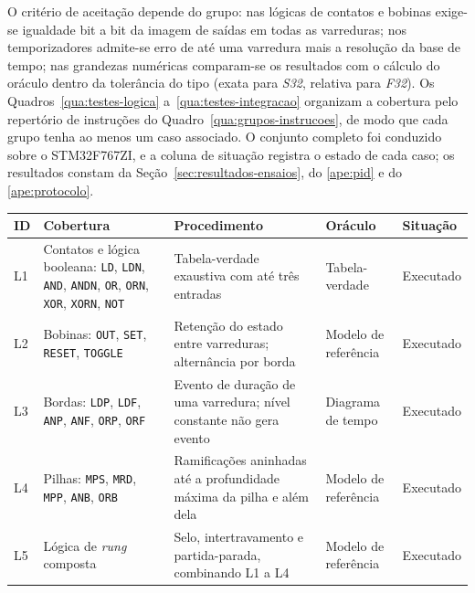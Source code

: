 O critério de aceitação depende do grupo: nas lógicas de contatos e bobinas exige-se igualdade bit a bit da imagem de saídas em todas as varreduras; nos temporizadores admite-se erro de até uma varredura mais a resolução da base de tempo; nas grandezas numéricas comparam-se os resultados com o cálculo do oráculo dentro da tolerância do tipo (exata para \textit{S32}, relativa para \textit{F32}).
Os Quadros~\ref{qua:testes-logica} a~\ref{qua:testes-integracao} organizam a cobertura pelo repertório de instruções do Quadro~\ref{qua:grupos-instrucoes}, de modo que cada grupo tenha ao menos um caso associado.
O conjunto completo foi conduzido sobre o STM32F767ZI, e a coluna de situação registra o estado de cada caso; os resultados constam da Seção~\ref{sec:resultados-ensaios}, do \ref{ape:pid} e do \ref{ape:protocolo}.

\begin{quadrofixo}
    \centering
    \small\singlespacing\sloppy
    \begin{tabular}{|p{0.8cm}|p{3.2cm}|p{4.8cm}|p{2.8cm}|p{2.3cm}|}
        \hline
        ID & Cobertura & Procedimento & Oráculo & Situação \\
        \hline
        L1 & Contatos e lógica booleana: \texttt{LD}, \texttt{LDN}, \texttt{AND}, \texttt{ANDN}, \texttt{OR}, \texttt{ORN}, \texttt{XOR}, \texttt{XORN}, \texttt{NOT} & Tabela-verdade exaustiva com até três entradas & Tabela-verdade & Executado \\
        \hline
        L2 & Bobinas: \texttt{OUT}, \texttt{SET}, \texttt{RESET}, \texttt{TOGGLE} & Retenção do estado entre varreduras; alternância por borda & Modelo de referência & Executado \\
        \hline
        L3 & Bordas: \texttt{LDP}, \texttt{LDF}, \texttt{ANP}, \texttt{ANF}, \texttt{ORP}, \texttt{ORF} & Evento de duração de uma varredura; nível constante não gera evento & Diagrama de tempo & Executado \\
        \hline
        L4 & Pilhas: \texttt{MPS}, \texttt{MRD}, \texttt{MPP}, \texttt{ANB}, \texttt{ORB} & Ramificações aninhadas até a profundidade máxima da pilha e além dela & Modelo de referência & Executado \\
        \hline
        L5 & Lógica de \textit{rung} composta & Selo, intertravamento e partida-parada, combinando L1 a L4 & Modelo de referência & Executado \\
        \hline
    \end{tabular}
    \label{qua:testes-logica}
\end{quadrofixo}

